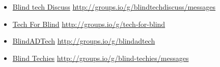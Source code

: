 \begin{itemize}[leftmargin=*]
\begin{itemize}[leftmargin=2em]
\item \href{http://groups.io/g/blindtechdiscuss/messages}{Blind tech Discuss}  \break\url{http://groups.io/g/blindtechdiscuss/messages}
\item \href{http://groups.io/g/tech-for-blind}{Tech For Blind}  \break\url{http://groups.io/g/tech-for-blind}
\item \href{http://groups.io/g/blindadtech}{BlindADTech}  \break\url{http://groups.io/g/blindadtech}
\item \href{http://groups.io/g/blind-techies/messages}{Blind Techies}  \break\url{http://groups.io/g/blind-techies/messages}
\end{itemize}
\end{itemize}